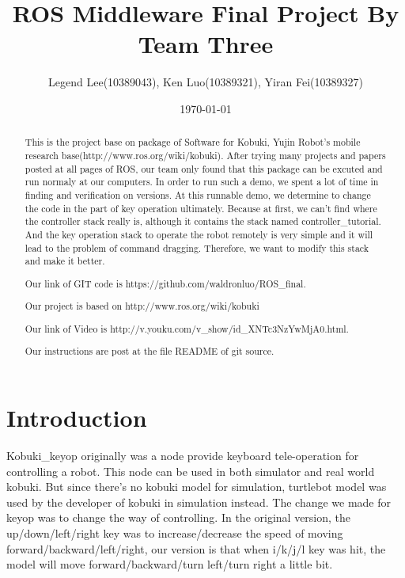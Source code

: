 \documentclass[preprint,pre,floats,aps,amsmath,amssymb]{revtex4}
\begin{document}
\title{ROS Middleware Final Project By Team Three}
\author{Legend Lee(10389043), Ken Luo(10389321), Yiran Fei(10389327)}
\date{\today}

\begin{abstract}
This is the project base on package of Software for Kobuki, Yujin Robot's mobile research base(http://www.ros.org/wiki/kobuki). After trying many projects and papers posted at all pages of ROS, our team only found that this package can be excuted and run normaly at our computers. In order to run such a demo, we spent a lot of time in finding and verification on versions. At this runnable demo, we determine to change the code in the part of key operation ultimately. Because at first, we can't find where the controller stack really is, although it contains the stack named controller\_tutorial. And the key operation stack to operate the robot remotely is very simple and it will lead to the problem of command dragging. Therefore, we want to modify this stack and make it better.

Our link of GIT code is https://github.com/waldronluo/ROS\_final.

Our project is based on http://www.ros.org/wiki/kobuki

Our link of Video is http://v.youku.com/v\_show/id\_XNTc3NzYwMjA0.html.

Our instructions are post at the file README of git source.
\end{abstract}

\maketitle

\section{Introduction}
\label{sec:intro}

Kobuki\_keyop originally was a node provide keyboard tele-operation for controlling a robot. This node can be used in both simulator and real world kobuki. But since there's no kobuki model for simulation, turtlebot model was used by the developer of kobuki in simulation instead. The change we made for keyop was to change the way of controlling. In the original version, the up/down/left/right key was to increase/decrease the speed of moving forward/backward/left/right, our version is that when i/k/j/l key was hit, the model will move forward/backward/turn left/turn right a little bit.
\end{document}

